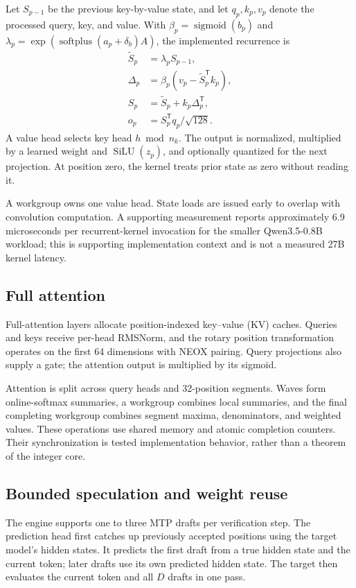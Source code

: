 \documentclass[10pt]{article}
\begin{document}
Let $S_{p-1}$ be the previous key-by-value state, and let $q_p,k_p,v_p$ denote the processed query, key, and value. With $\beta_p=\operatorname{sigmoid}(b_p)$ and $\lambda_p=\exp(\operatorname{softplus}(a_p+\delta_b)A)$, the implemented recurrence is
\begin{align}
 \widetilde S_p&=\lambda_p S_{p-1},\\
 \Delta_p&=\beta_p(v_p-\widetilde S_p^{\mathsf T}k_p),\\
 S_p&=\widetilde S_p+k_p\Delta_p^{\mathsf T},\\
 o_p&=S_p^{\mathsf T}q_p/\sqrt{128}.
\end{align}
A value head selects key head $h\bmod n_k$. The output is normalized, multiplied by a learned weight and $\operatorname{SiLU}(z_p)$, and optionally quantized for the next projection. At position zero, the kernel treats prior state as zero without reading it.

A workgroup owns one value head. State loads are issued early to overlap with convolution computation. A supporting measurement reports approximately 6.9 microseconds per recurrent-kernel invocation for the smaller Qwen3.5-0.8B workload; this is supporting implementation context and is not a measured 27B kernel latency.

\subsection{Full attention}
Full-attention layers allocate position-indexed key--value (KV) caches. Queries and keys receive per-head RMSNorm, and the rotary position transformation operates on the first 64 dimensions with NEOX pairing. Query projections also supply a gate; the attention output is multiplied by its sigmoid.

Attention is split across query heads and 32-position segments. Waves form online-softmax summaries, a workgroup combines local summaries, and the final completing workgroup combines segment maxima, denominators, and weighted values. These operations use shared memory and atomic completion counters. Their synchronization is tested implementation behavior, rather than a theorem of the integer core.

\subsection{Bounded speculation and weight reuse}
The engine supports one to three MTP drafts per verification step. The prediction head first catches up previously accepted positions using the target model's hidden states. It predicts the first draft from a true hidden state and the current token; later drafts use its own predicted hidden state. The target then evaluates the current token and all $D$ drafts in one pass.
\end{document}
